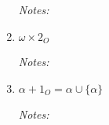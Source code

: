 \documentclass[justified]{tufte-handout}
\begin{document}
\begin{enumerate}[label=\roman*.]
\noindent \emph{Notes:}  \underline{\hspace{15.4cm}}\\

\item $\omega\times 2_O$

\noindent \emph{Notes:}  \underline{\hspace{15.4cm}}\\

\item $\alpha+1_O=\alpha\cup\{\alpha\}$

\noindent \emph{Notes:}  \underline{\hspace{15.4cm}}\\
\end{enumerate}
\end{document}
